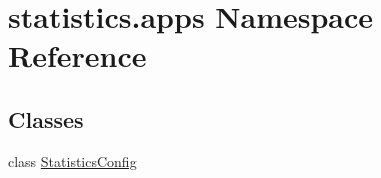 \hypertarget{namespacestatistics_1_1apps}{}\section{statistics.\+apps Namespace Reference}
\label{namespacestatistics_1_1apps}
\subsection*{Classes}
\begin{DoxyCompactItemize}
\item 
class \hyperlink{classstatistics_1_1apps_1_1StatisticsConfig}{Statistics\+Config}
\end{DoxyCompactItemize}
